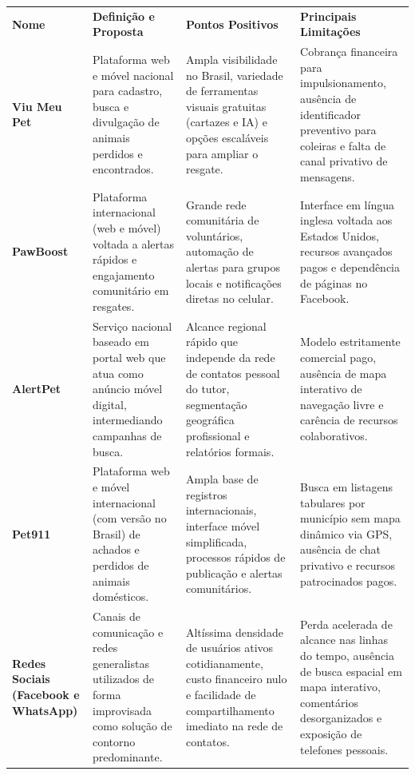 \clearpage

\begin{table}[H]
\centering
{}\label{quadro:similares}
\small
\renewcommand{\arraystretch}{0.94}
\setlength{\tabcolsep}{3.5pt}
\begin{tabular}{|>{\raggedright\arraybackslash}p{2.2cm}|>{\raggedright\arraybackslash}p{3.2cm}|>{\raggedright\arraybackslash}p{4.3cm}|>{\raggedright\arraybackslash}p{4.5cm}|}
\hline
\multicolumn{4}{|c|}{\textbf{Quadro 1: Análise Comparativa dos Sistemas Similares e Soluções de Contorno}} \\ \hline
\textbf{Nome} & \textbf{Definição e Proposta} & \textbf{Pontos Positivos} & \textbf{Principais Limitações} \\ \hline
\textbf{Viu Meu Pet} & Plataforma web e móvel nacional para cadastro, busca e divulgação de animais perdidos e encontrados. & Ampla visibilidade no Brasil, variedade de ferramentas visuais gratuitas (cartazes e IA) e opções escaláveis para ampliar o resgate. & Cobrança financeira para impulsionamento, ausência de identificador preventivo para coleiras e falta de canal privativo de mensagens. \\ \hline
\textbf{PawBoost} & Plataforma internacional (web e móvel) voltada a alertas rápidos e engajamento comunitário em resgates. & Grande rede comunitária de voluntários, automação de alertas para grupos locais e notificações diretas no celular. & Interface em língua inglesa voltada aos Estados Unidos, recursos avançados pagos e dependência de páginas no Facebook. \\ \hline
\textbf{AlertPet} & Serviço nacional baseado em portal web que atua como anúncio móvel digital, intermediando campanhas de busca. & Alcance regional rápido que independe da rede de contatos pessoal do tutor, segmentação geográfica profissional e relatórios formais. & Modelo estritamente comercial pago, ausência de mapa interativo de navegação livre e carência de recursos colaborativos. \\ \hline
\textbf{Pet911} & Plataforma web e móvel internacional (com versão no Brasil) de achados e perdidos de animais domésticos. & Ampla base de registros internacionais, interface móvel simplificada, processos rápidos de publicação e alertas comunitários. & Busca em listagens tabulares por município sem mapa dinâmico via GPS, ausência de chat privativo e recursos patrocinados pagos. \\ \hline
\textbf{Redes Sociais (Facebook e WhatsApp)} & Canais de comunicação e redes generalistas utilizados de forma improvisada como solução de contorno predominante. & Altíssima densidade de usuários ativos cotidianamente, custo financeiro nulo e facilidade de compartilhamento imediato na rede de contatos. & Perda acelerada de alcance nas linhas do tempo, ausência de busca espacial em mapa interativo, comentários desorganizados e exposição de telefones pessoais. \\ \hline
\end{tabular}
\vspace{-0.2cm}
\end{table}

